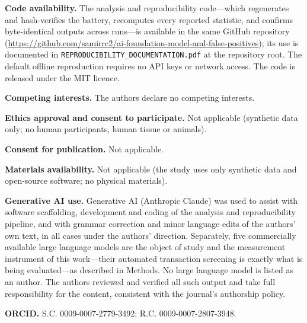 \documentclass[pdflatex,sn-basic,Numbered]{sn-jnl}
\begin{document}
\textbf{Code availability.} The analysis and reproducibility code---which regenerates and hash-verifies the battery, recomputes every reported statistic, and confirms byte-identical outputs across runs---is available in the same GitHub repository (\url{https://github.com/samirrc2/ai-foundation-model-aml-false-positives}); its use is documented in \texttt{REPRODUCIBILITY\_DOCUMENTATION.pdf} at the repository root. The default offline reproduction requires no API keys or network access. The code is released under the MIT licence.

\textbf{Competing interests.} The authors declare no competing interests.

\textbf{Ethics approval and consent to participate.} Not applicable (synthetic data only; no human participants, human tissue or animals).

\textbf{Consent for publication.} Not applicable.

\textbf{Materials availability.} Not applicable (the study uses only synthetic data and open-source software; no physical materials).

\textbf{Generative AI use.} Generative AI (Anthropic Claude) was used to assist with software scaffolding, development and coding of the analysis and reproducibility pipeline, and with grammar correction and minor language edits of the authors' own text, in all cases under the authors' direction. Separately, five commercially available large language models are the object of study and the measurement instrument of this work---their automated transaction screening is exactly what is being evaluated---as described in Methods. No large language model is listed as an author. The authors reviewed and verified all such output and take full responsibility for the content, consistent with the journal's authorship policy.

\textbf{ORCID.} S.C. 0009-0007-2779-3492; R.C. 0009-0007-2807-3948.


\end{document}
